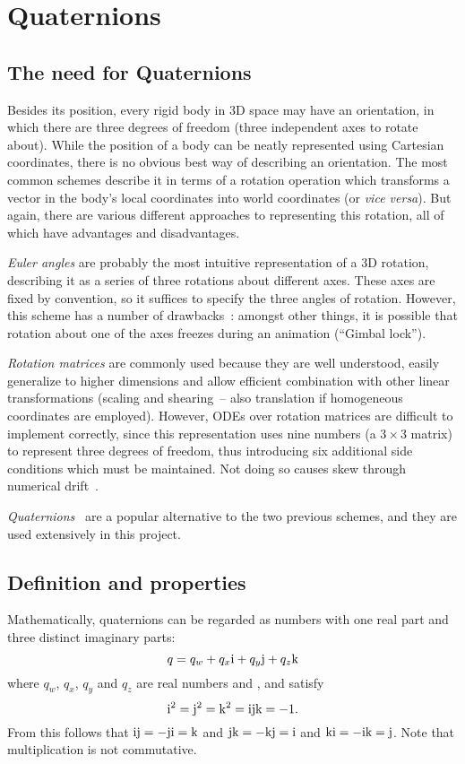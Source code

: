\section{Quaternions\label{quaternions}}
\subsection{The need for Quaternions}
Besides its position, every rigid body in 3D space may have an orientation, in which there are
three degrees of freedom (three independent axes to rotate about).
While the position of a body can be neatly represented using Cartesian coordinates, there is
no obvious best way of describing an orientation. The most common schemes describe
it in terms of a rotation operation which transforms a vector in the body's local
coordinates into world coordinates (or \textsl{vice versa}). But again, there are various different
approaches to representing this rotation, all of which have advantages and disadvantages.

\emph{Euler angles} are probably the most intuitive representation of a 3D rotation, describing
it as a series of three rotations about different axes. These axes are fixed by convention, so it
suffices to specify the three angles of rotation. However, this scheme has a number of
drawbacks~\cite{Saunders:PhD,Shoemake:85}: amongst other things, it is possible that rotation
about one of the axes freezes during an animation (``Gimbal lock'').

\emph{Rotation matrices} are commonly used because they are well understood, easily generalize
to higher dimensions and allow efficient combination with other linear transformations (scaling
and shearing~-- also translation if homogeneous coordinates are employed). However, ODEs over
rotation matrices are difficult to implement correctly, since this representation uses nine
numbers (a $3\times3$ matrix) to represent three degrees of freedom, thus introducing six
additional side conditions which must be maintained. Not doing so causes skew through numerical
drift~\cite{Saunders:PhD}.

\emph{Quaternions}~\cite{Shoemake:85,Eberly:01,MathWorld:Quaternion} are a popular alternative
to the two previous schemes, and they are used extensively in this project.

\subsection{Definition and properties}
Mathematically, quaternions can be regarded as numbers with one real part and three
distinct imaginary parts:
\begin{equation}
q = q_w + q_x\mathrm{i} + q_y\mathrm{j} + q_z\mathrm{k}
\end{equation}
where $q_w$, $q_x$, $q_y$ and $q_z$ are real numbers and \qi{}, \qj{} and \qk{} satisfy
\begin{equation}
\mathrm{i}^2 = \mathrm{j}^2 = \mathrm{k}^2 = \mathrm{i}\mathrm{j}\mathrm{k} = -1.
\end{equation}
From this follows that
$\mathrm{i}\mathrm{j} = -\mathrm{j}\mathrm{i} = \mathrm{k}$ and
$\mathrm{j}\mathrm{k} = -\mathrm{k}\mathrm{j} = \mathrm{i}$ and
$\mathrm{k}\mathrm{i} = -\mathrm{i}\mathrm{k} = \mathrm{j}$.
Note that multiplication is not commutative.

